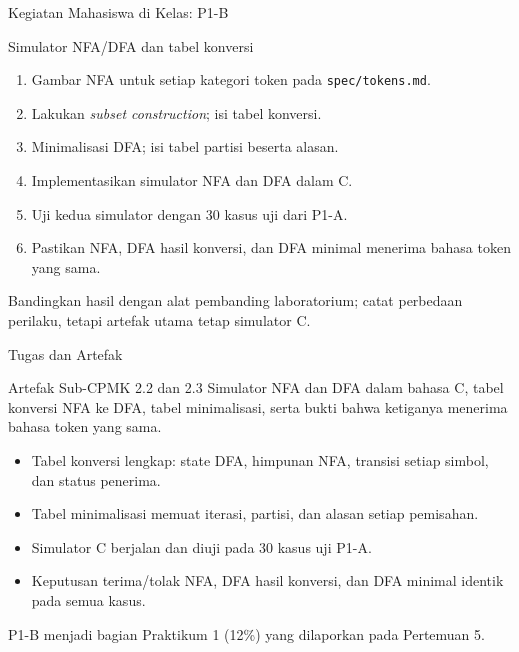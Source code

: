 \documentclass[aspectratio=169,10pt,t]{beamer}
\begin{document}
\begin{frame}{Kegiatan Mahasiswa di Kelas: P1-B}
  \begin{block}{Simulator NFA/DFA dan tabel konversi}
    \footnotesize
    \begin{enumerate}
      \setlength{\itemsep}{1pt}
      \item Gambar NFA untuk setiap kategori token pada
            \texttt{spec/tokens.md}.
      \item Lakukan \textit{subset construction}; isi tabel konversi.
      \item Minimalisasi DFA; isi tabel partisi beserta alasan.
      \item Implementasikan simulator NFA dan DFA dalam C.
      \item Uji kedua simulator dengan 30 kasus uji dari P1-A.
      \item Pastikan NFA, DFA hasil konversi, dan DFA minimal menerima
            bahasa token yang sama.
    \end{enumerate}
  \end{block}

  \vspace{2pt}
  {\footnotesize\color{ubbblue!80}Bandingkan hasil dengan alat pembanding
  laboratorium; catat perbedaan perilaku, tetapi artefak utama tetap
  simulator C.}
\end{frame}

\begin{frame}{Tugas dan Artefak}
  \begin{block}{Artefak Sub-CPMK 2.2 dan 2.3}
    Simulator NFA dan DFA dalam bahasa C, tabel konversi NFA ke DFA,
    tabel minimalisasi, serta bukti bahwa ketiganya menerima bahasa
    token yang sama.
  \end{block}

  \small
  \begin{itemize}
    \item Tabel konversi lengkap: state DFA, himpunan NFA, transisi
          setiap simbol, dan status penerima.
    \item Tabel minimalisasi memuat iterasi, partisi, dan alasan setiap
          pemisahan.
    \item Simulator C berjalan dan diuji pada 30 kasus uji P1-A.
    \item Keputusan terima/tolak NFA, DFA hasil konversi, dan DFA
          minimal identik pada semua kasus.
  \end{itemize}

  \vspace{3pt}
  {\footnotesize\color{ubbblue!75}P1-B menjadi bagian Praktikum 1
  (12\%) yang dilaporkan pada Pertemuan 5.}
\end{frame}
\end{document}
